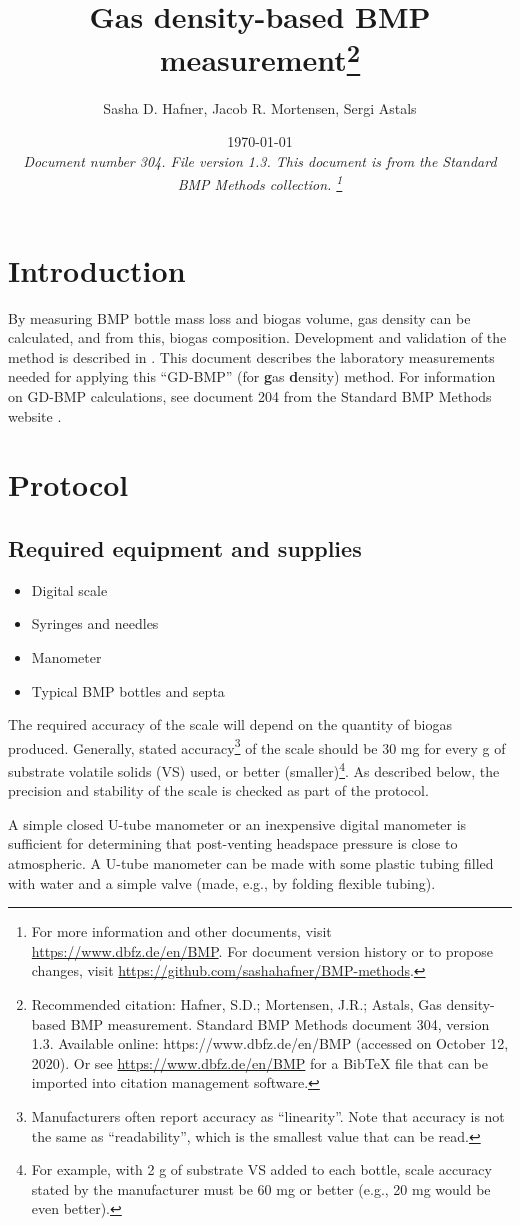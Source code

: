 \documentclass[]{article}
\title {Gas density-based BMP measurement\footnote{
  Recommended citation: 
Hafner, S.D.; Mortensen, J.R.; Astals, Gas density-based BMP measurement. Standard BMP Methods document 304, version 1.3. Available online: https://www.dbfz.de/en/BMP (accessed on October 12, 2020).
\newline
  Or see \url{https://www.dbfz.de/en/BMP} for a BibTeX file that can be imported into citation management software.
}
}
\author{Sasha D. Hafner, Jacob R. Mortensen, Sergi Astals}
\date{\today \\
\bigskip
\textit{
  Document number 304.
  File version 1.3. 
  This document is from the Standard BMP Methods collection.
    \footnote{For more information and other documents, visit \url{https://www.dbfz.de/en/BMP}. 
    For document version history or to propose changes, visit \url{https://github.com/sashahafner/BMP-methods}.}
}
}
\begin{document}
\maketitle

\section{Introduction}
By measuring BMP bottle mass loss and biogas volume, gas density can be calculated, and from this, biogas composition.
Development and validation of the method is described in \citet{justesenDevelopmentValidationLowcost2019}.
This document describes the laboratory measurements needed for applying this ``GD-BMP'' (for \textbf{g}as \textbf{d}ensity) method.
For information on GD-BMP calculations, see document 204 from the Standard BMP Methods website \citep{BMPdoc204gasdens}. 

\section{Protocol}

\subsection{Required equipment and supplies}

\begin{itemize}
    \item Digital scale
    \item Syringes and needles
    \item Manometer
    \item Typical BMP bottles and septa
\end{itemize}

The required accuracy of the scale will depend on the quantity of biogas produced. 
Generally, stated accuracy\footnote{
  Manufacturers often report accuracy as ``linearity''. 
  Note that accuracy is not the same as ``readability'', which is the smallest value that can be read. 
} of the scale should be 30 mg for every g of substrate volatile solids (VS) used, or better (smaller)\footnote{
  For example, with 2 g of substrate VS added to each bottle, scale accuracy stated by the manufacturer must be 60 mg or better (e.g., 20 mg would be even better).
}.
As described below, the precision and stability of the scale is checked as part of the protocol.

A simple closed U-tube manometer or an inexpensive digital manometer is sufficient for determining that post-venting headspace pressure is close to atmospheric.
A U-tube manometer can be made with some plastic tubing filled with water and a simple valve (made, e.g., by folding flexible tubing).
\end{document}
